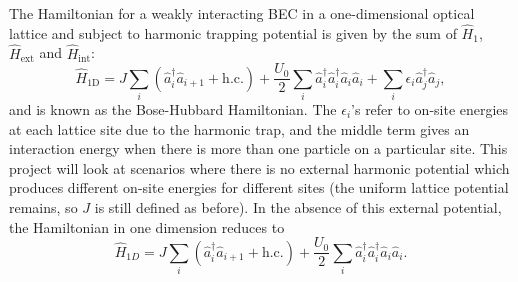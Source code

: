 \documentclass[prb, twocolumn, final]{revtex4-1}
\theoremstyle{plain}
\begin{document}
The Hamiltonian for a weakly interacting BEC in a one-dimensional optical
lattice and subject to harmonic trapping potential is given by the sum of
$\hat{H}_{1}$, $\hat{H}_{\text{ext}}$ and $\hat{H}_{\text{int}}$:
\begin{equation}
    \hat{H}_{\text{1D}}
    =
    J \sum_{i}{(\hat{a}^\dagger_{i}\hat{a}_{i+1} + \text{h.c.})} +
    \frac{U_{0}}{2}
    \sum_{i}%
        {\hat{a}_{i}^{\dagger} \hat{a}_{i}^{\dagger} \hat{a}_{i} \hat{a}_{i}} +
    \sum_{i}%
        {\epsilon_{i} \hat{a}_{j}^{\dagger} \hat{a}_{j}},
\end{equation}
and is known as the Bose-Hubbard Hamiltonian. The $\epsilon_{i}$'s refer to
on-site energies at each lattice site due to the harmonic trap, and the middle
term gives an interaction energy when there is more than one particle on a
particular site. This project will look at scenarios where there is no external
harmonic potential which produces different on-site energies for different sites
(the uniform lattice potential remains, so $J$ is still defined as before). In
the absence of this external potential, the Hamiltonian in one dimension reduces
to
\begin{equation*}
    \hat{H}_{1D}
    =
    J \sum_{i}{(\hat{a}^\dagger_{i}\hat{a}_{i+1} + \text{h.c.})} +
    \frac{U_{0}}{2}
    \sum_{i}{\hat{a}^\dagger_{i} \hat{a}^\dagger_{i} \hat{a}_{i}\hat{a}_{i}}.
\end{equation*}
\end{document}
